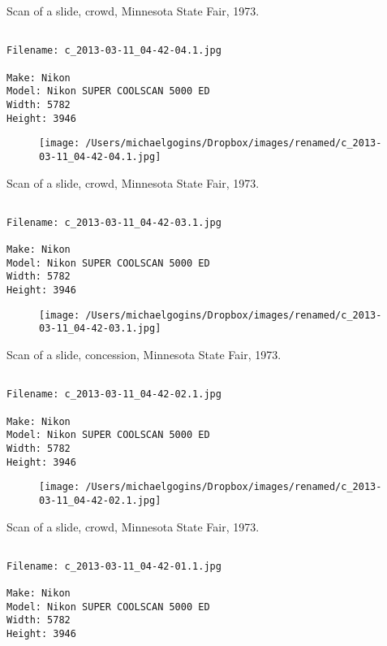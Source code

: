 \documentclass[11pt,letter,DIV=14,paper=landscape]{scrbook}
\begin{document}
\clearpage
\noindent Scan of a slide, crowd, Minnesota State Fair, 1973.
\noindent
\begin{lstlisting}

Filename: c_2013-03-11_04-42-04.1.jpg

Make: Nikon
Model: Nikon SUPER COOLSCAN 5000 ED
Width: 5782
Height: 3946
\end{lstlisting}
\clearpage

\begin{figure}
\texttt{[image: /Users/michaelgogins/Dropbox/images/renamed/c\_2013-03-11\_04-42-04.1.jpg]}
\end{figure}
    
\clearpage
\noindent Scan of a slide, crowd, Minnesota State Fair, 1973.
\noindent
\begin{lstlisting}

Filename: c_2013-03-11_04-42-03.1.jpg

Make: Nikon
Model: Nikon SUPER COOLSCAN 5000 ED
Width: 5782
Height: 3946
\end{lstlisting}
\clearpage

\begin{figure}
\texttt{[image: /Users/michaelgogins/Dropbox/images/renamed/c\_2013-03-11\_04-42-03.1.jpg]}
\end{figure}
    
\clearpage
\noindent Scan of a slide, concession, Minnesota State Fair, 1973.
\noindent
\begin{lstlisting}

Filename: c_2013-03-11_04-42-02.1.jpg

Make: Nikon
Model: Nikon SUPER COOLSCAN 5000 ED
Width: 5782
Height: 3946
\end{lstlisting}
\clearpage

\begin{figure}
\texttt{[image: /Users/michaelgogins/Dropbox/images/renamed/c\_2013-03-11\_04-42-02.1.jpg]}
\end{figure}
    
\clearpage
\noindent Scan of a slide, crowd, Minnesota State Fair, 1973.
\noindent
\begin{lstlisting}

Filename: c_2013-03-11_04-42-01.1.jpg

Make: Nikon
Model: Nikon SUPER COOLSCAN 5000 ED
Width: 5782
Height: 3946
\end{lstlisting}
\clearpage
\end{document}
